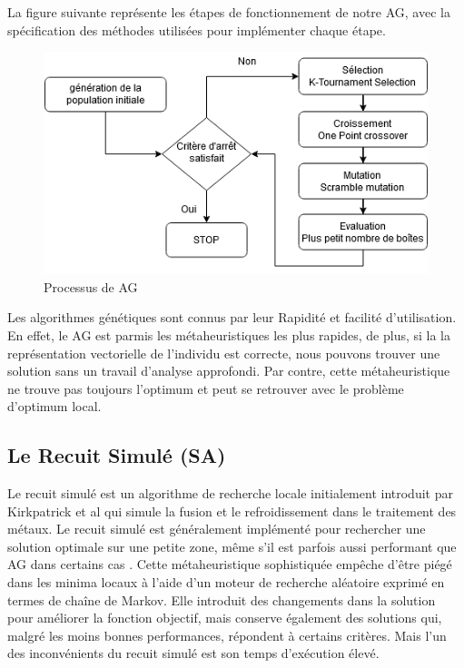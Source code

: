 \documentclass[preprint]{elsarticle}
\begin{document}
La figure suivante représente les étapes de fonctionnement de notre AG, avec la spécification des méthodes utilisées pour implémenter chaque étape. 

\begin{figure}[!h]
    \centering
    \includegraphics[scale=0.6]{./figures/AG schema.png}
    \caption{Processus de AG }
    \label{fig:agschema}
\end{figure}
Les algorithmes génétiques sont connus par leur Rapidité et facilité d’utilisation. 
En effet, le AG est parmis les métaheuristiques les plus rapides, de plus, si la la représentation vectorielle de l'individu est correcte, nous pouvons trouver une solution sans un travail d'analyse approfondi. Par contre, cette métaheuristique ne trouve pas toujours l’optimum et peut se retrouver avec le problème d’optimum local. 

\subsection{Le Recuit Simulé (SA)}
Le recuit simulé est un algorithme de recherche locale initialement introduit par Kirkpatrick et al \cite{kirk} qui simule la fusion et le refroidissement dans le traitement des métaux. Le recuit simulé est généralement implémenté pour rechercher une solution optimale sur une petite zone, même s'il est parfois aussi performant que AG dans certains cas \cite{Alkhateeb}.
Cette métaheuristique sophistiquée empêche d'être piégé dans les minima locaux à l'aide d'un moteur de recherche aléatoire exprimé en termes de chaîne de Markov. Elle introduit des changements dans la solution pour améliorer la fonction objectif, mais conserve également des solutions qui, malgré les moins bonnes performances, répondent à certains critères. Mais l’un des inconvénients du recuit simulé est son temps d'exécution élevé. 
\end{document}
